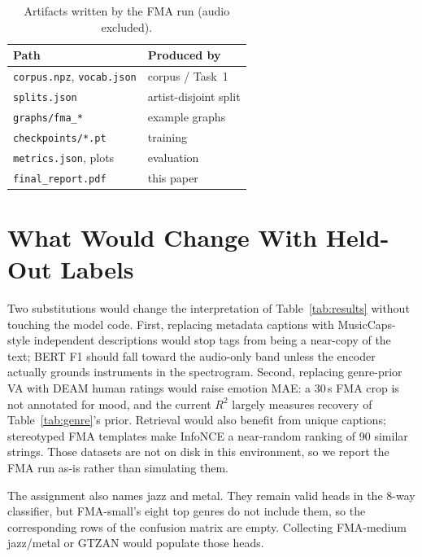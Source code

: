 \documentclass[conference]{IEEEtran}
\begin{document}
\begin{table}[t]
\caption{Artifacts written by the FMA run (audio excluded).}
\label{tab:art}
\centering
\scriptsize
\renewcommand{\arraystretch}{1.15}
\begin{tabularx}{\columnwidth}{@{}>{\raggedright\arraybackslash}X>{\raggedright\arraybackslash}X@{}}
\toprule
Path & Produced by \\
\midrule
\texttt{corpus.npz}, \texttt{vocab.json} & corpus / Task~1 \\
\texttt{splits.json} & artist-disjoint split \\
\texttt{graphs/fma\_*} & 24 example graphs \\
\texttt{checkpoints/*.pt} & training \\
\texttt{metrics.json}, plots & evaluation \\
\texttt{final\_report.pdf} & this paper \\
\bottomrule
\end{tabularx}
\end{table}

\section{What Would Change With Held-Out Labels}
Two substitutions would change the interpretation of Table~\ref{tab:results} without touching the model code. First, replacing metadata captions with MusicCaps-style independent descriptions would stop tags from being a near-copy of the text; BERT F1 should fall toward the audio-only band unless the encoder actually grounds instruments in the spectrogram. Second, replacing genre-prior VA with DEAM human ratings would raise emotion MAE: a 30\,s FMA crop is not annotated for mood, and the current $R^2$ largely measures recovery of Table~\ref{tab:genre}'s prior. Retrieval would also benefit from unique captions; stereotyped FMA templates make InfoNCE a near-random ranking of 90 similar strings. Those datasets are not on disk in this environment, so we report the FMA run as-is rather than simulating them.

The assignment also names jazz and metal. They remain valid heads in the 8-way classifier, but FMA-small's eight top genres do not include them, so the corresponding rows of the confusion matrix are empty. Collecting FMA-medium jazz/metal or GTZAN would populate those heads.
\end{document}
